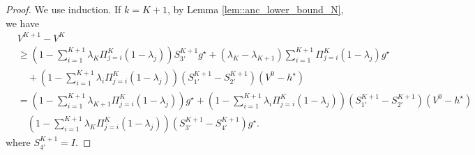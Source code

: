 \documentclass[10pt,a4paper]{amsart}
\newcommand*{\para}[1]{\left({#1}\right)}
\begin{document}
\begin{proof}

We use induction. If $k=K+1$, by Lemma \ref{lem::anc_lower_bound_N}, we have
\begin{align*}
&V^{K+1}-V^{K} 
\\&\ge \para{1-\sum_{i=1}^{K+1} \lambda_{K} \Pi^{K}_{j=i} (1-\lambda_j)}S_{3'}^{K+1}g^{\star} +(\lambda_{K}-\lambda_{K+1})  \sum_{i=1}^{K+1} \Pi^{K}_{j=i} (1-\lambda_j)g^{\star}
\\& \quad + \para{1-\sum_{i=1}^{K+1} \lambda_i \Pi^{K}_{j=i} (1-\lambda_j)}(S^{K+1}_{1'} -S^{K+1}_{2'})(V^0-h^{\star})
\\& = \para{1-\sum_{i=1}^{K+1} \lambda_{K+1} \Pi^{K}_{j=i} (1-\lambda_j)}g^{\star}+ \para{1-\sum_{i=1}^{K+1} \lambda_i \Pi^{K}_{j=i} (1-\lambda_j)}(S^{K+1}_{1'} -S^{K+1}_{2'})(V^0-h^{\star})
\\& \quad \para{1-\sum_{i=1}^{K+1} \lambda_{K} \Pi^{K}_{j=i} (1-\lambda_j)}\para{S_{3'}^{K+1}-S^{K+1}_{4'}}g^{\star}.
\end{align*}
where $S^{K+1}_{4'}= I$.


\end{proof}
\end{document}
